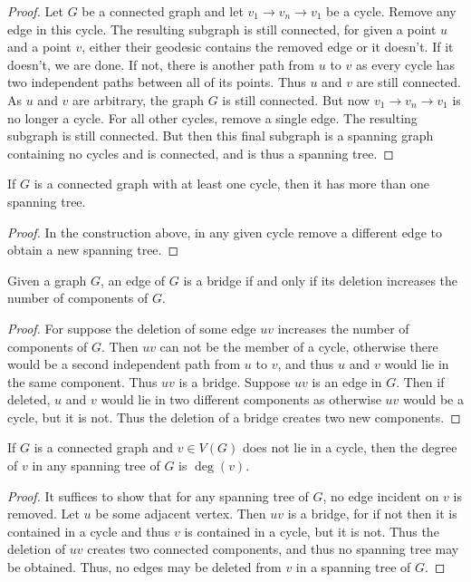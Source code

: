 \documentclass[crop=false,class=book,oneside]{standalone}
\begin{document}
        \begin{proof}
        Let $G$ be a connected graph and let $v_1 \rightarrow v_n\rightarrow v_1$ be a cycle. Remove any edge in this cycle. The resulting subgraph is still connected, for given a point $u$ and a point $v$, either their geodesic contains the removed edge or it doesn't. If it doesn't, we are done. If not, there is another path from $u$ to $v$ as every cycle has two independent paths between all of its points. Thus $u$ and $v$ are still connected. As $u$ and $v$ are arbitrary, the graph $G$ is still connected. But now $v_1\rightarrow v_n \rightarrow v_1$ is no longer a cycle. For all other cycles, remove a single edge. The resulting subgraph is still connected. But then this final subgraph is a spanning graph containing no cycles and is connected, and is thus a spanning tree.
        \end{proof}
        \begin{corollary}
        If $G$ is a connected graph with at least one cycle, then it has more than one spanning tree.
        \end{corollary}
        \begin{proof}
        In the construction above, in any given cycle remove a different edge to obtain a new spanning tree.
        \end{proof}
        \begin{theorem}
        Given a graph $G$, an edge of $G$ is a bridge if and only if its deletion increases the number of components of $G$.
        \end{theorem}
        \begin{proof}
        For suppose the deletion of some edge $uv$ increases the number of components of $G$. Then $uv$ can not be the member of a cycle, otherwise there would be a second independent path from $u$ to $v$, and thus $u$ and $v$ would lie in the same component. Thus $uv$ is a bridge. Suppose $uv$ is an edge in $G$. Then if deleted, $u$ and $v$ would lie in two different components as otherwise $uv$ would be a cycle, but it is not. Thus the deletion of a bridge creates two new components.
        \end{proof}
        \begin{corollary}
        If $G$ is a connected graph and $v\in V(G)$ does not lie in a cycle, then the degree of $v$ in any spanning tree of $G$ is $\deg(v)$.
        \end{corollary}
        \begin{proof}
        It suffices to show that for any spanning tree of $G$, no edge incident on $v$ is removed. Let $u$ be some adjacent vertex. Then $uv$ is a bridge, for if not then it is contained in a cycle and thus $v$ is contained in a cycle, but it is not. Thus the deletion of $uv$ creates two connected components, and thus no spanning tree may be obtained. Thus, no edges may be deleted from $v$ in a spanning tree of $G$.
        \end{proof}
\end{document}
